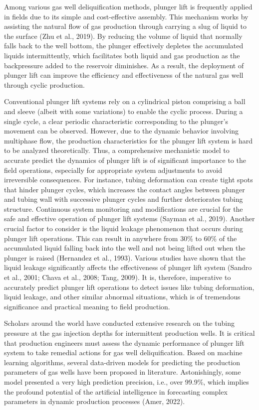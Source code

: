 \documentclass[sn-mathphys,Numbered]{sn-jnl}%
\theoremstyle{thmstyleone}%
\theoremstyle{thmstyletwo}%
\theoremstyle{thmstylethree}%
\begin{document}
Among various gas well deliquification methods, plunger lift is frequently applied in fields due to its simple and cost-effective assembly. This mechanism works by assisting the natural flow of gas production through carrying a slug of liquid to the surface (Zhu et al., 2019). By reducing the volume of liquid that normally falls back to the well bottom, the plunger effectively depletes the accumulated liquids intermittently, which facilitates both liquid and gas production as the backpressure added to the reservoir diminishes. As a result, the deployment of plunger lift can improve the efficiency and effectiveness of the natural gas well through cyclic production.

Conventional plunger lift systems rely on a cylindrical piston comprising a ball and sleeve (albeit with some variations) to enable the cyclic process. During a single cycle, a clear periodic characteristic corresponding to the plunger's movement can be observed. However, due to the dynamic behavior involving multiphase flow, the production characteristics for the plunger lift system is hard to be analyzed theoretically. Thus, a comprehensive mechanistic model to accurate predict the dynamics of plunger lift is of significant importance to the field operations, especially for appropriate system adjustments to avoid irreversible consequences. For instance, tubing deformation can create tight spots that hinder plunger cycles, which increases the contact angles between plunger and tubing wall with successive plunger cycles and further deteriorates tubing structure. Continuous system monitoring and modifications are crucial for the safe and effective operation of plunger lift systems (Sayman et al., 2019). Another crucial factor to consider is the liquid leakage phenomenon that occurs during plunger lift operations. This can result in anywhere from 30\% to 60\% of the accumulated liquid falling back into the well and not being lifted out when the plunger is raised (Hernandez et al., 1993). Various studies have shown that the liquid leakage significantly affects the effectiveness of plunger lift system (Sandro et al., 2001; Chava et al., 2008; Tang, 2009). It is, therefore, imperative to accurately predict plunger lift operations to detect issues like tubing deformation, liquid leakage, and other similar abnormal situations, which is of tremendous significance and practical meaning to field production.

Scholars around the world have conducted extensive research on the tubing pressure at the gas injection depths for intermittent production wells. It is critical that production engineers must assess the dynamic performance of plunger lift system to take remedial actions for gas well deliquification. Based on machine learning algorithms, several data-driven models for predicting the production parameters of gas wells have been proposed in literature. Astonishingly, some model presented a very high prediction precision, i.e., over 99.9\%, which implies the profound potential of the artificial intelligence in forecasting complex parameters in dynamic production processes (Amer, 2022).
\end{document}
